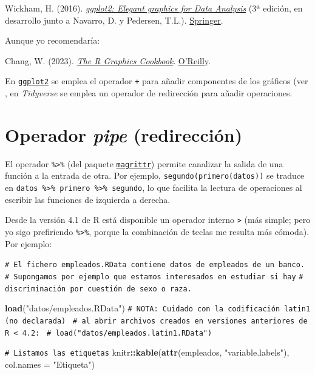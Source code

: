 \documentclass[
]{book}
\newenvironment{Shaded}{\begin{snugshade}}{\end{snugshade}}
\newcommand{\AttributeTok}[1]{\textcolor[rgb]{0.13,0.29,0.53}{#1}}
\newcommand{\CommentTok}[1]{\textcolor[rgb]{0.56,0.35,0.01}{\textit{#1}}}
\newcommand{\FunctionTok}[1]{\textcolor[rgb]{0.13,0.29,0.53}{\textbf{#1}}}
\newcommand{\NormalTok}[1]{#1}
\newcommand{\SpecialCharTok}[1]{\textcolor[rgb]{0.81,0.36,0.00}{\textbf{#1}}}
\newcommand{\StringTok}[1]{\textcolor[rgb]{0.31,0.60,0.02}{#1}}
\theoremstyle{break}
\theoremstyle{nonumberplain}
\renewcommand{\CommentTok}[1]{\textcolor[rgb]{0.41,0.41,0.41}{\texttt{#1}}}
\begin{document}
Wickham, H. (2016). \emph{\href{https://ggplot2-book.org}{ggplot2: Elegant graphics for Data Analysis}} (3ª edición, en desarrollo junto a Navarro, D. y Pedersen, T.L.). \href{https://www.amazon.com/gp/product/331924275X}{Springer}.

Aunque yo recomendaría:

Chang, W. (2023). \emph{\href{https://r-graphics.org}{The R Graphics Cookbook}}. \href{https://www.amazon.com/dp/1491978600}{O'Reilly}.

En \href{https://ggplot2.tidyverse.org}{\texttt{ggplot2}} se emplea el operador \texttt{+} para añadir componentes de los gráficos (ver , en \emph{Tidyverse} se emplea un operador de redirección para añadir operaciones.

\section{\texorpdfstring{Operador \emph{pipe} (redirección)}{Operador pipe (redirección)}}\label{pipe}

El operador \texttt{\%\textgreater{}\%} (del paquete \href{https://magrittr.tidyverse.org}{\texttt{magrittr}}) permite canalizar la salida de una función a la entrada de otra.
Por ejemplo, \texttt{segundo(primero(datos))} se traduce en \texttt{datos\ \%\textgreater{}\%\ primero\ \%\textgreater{}\%\ segundo}, lo que facilita la lectura de operaciones al escribir las funciones de izquierda a derecha.

Desde la versión 4.1 de R está disponible un operador interno \texttt{\textbar{}\textgreater{}} (más simple; pero yo sigo prefiriendo \texttt{\%\textgreater{}\%}, porque la combinación de teclas me resulta más cómoda).
Por ejemplo:

\begin{Shaded}
\begin{Highlighting}[]
\CommentTok{\# El fichero \textquotesingle{}empleados.RData\textquotesingle{} contiene datos de empleados de un banco.}
\CommentTok{\# Supongamos por ejemplo que estamos interesados en estudiar si hay}
\CommentTok{\# discriminación por cuestión de sexo o raza.}

\FunctionTok{load}\NormalTok{(}\StringTok{"datos/empleados.RData"}\NormalTok{)}
\CommentTok{\# NOTA: Cuidado con la codificación latin1 (no declarada) }
\CommentTok{\# al abrir archivos creados en versiones anteriores de R \textless{} 4.2: }
\CommentTok{\# load("datos/empleados.latin1.RData")}

\CommentTok{\# Listamos las etiquetas}
\NormalTok{knitr}\SpecialCharTok{::}\FunctionTok{kable}\NormalTok{(}\FunctionTok{attr}\NormalTok{(empleados, }\StringTok{"variable.labels"}\NormalTok{), }\AttributeTok{col.names =} \StringTok{"Etiqueta"}\NormalTok{)}
\end{Highlighting}
\end{Shaded}
\end{document}
